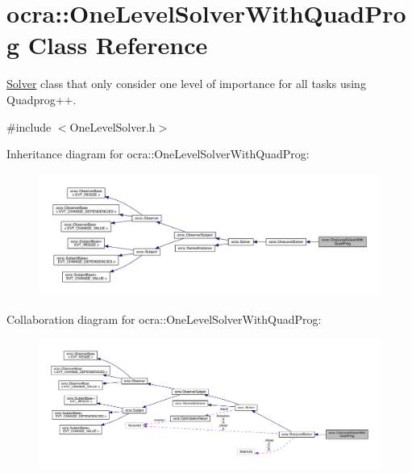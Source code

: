 \hypertarget{classocra_1_1OneLevelSolverWithQuadProg}{}\section{ocra\+:\+:One\+Level\+Solver\+With\+Quad\+Prog Class Reference}
\label{classocra_1_1OneLevelSolverWithQuadProg}


\hyperlink{classocra_1_1Solver}{Solver} class that only consider one level of importance for all tasks using Quadprog++.  




{\ttfamily \#include $<$One\+Level\+Solver.\+h$>$}



Inheritance diagram for ocra\+:\+:One\+Level\+Solver\+With\+Quad\+Prog\+:\nopagebreak
\begin{figure}[H]
\begin{center}
\leavevmode
\includegraphics[width=350pt]{db/d00/classocra_1_1OneLevelSolverWithQuadProg__inherit__graph}
\end{center}
\end{figure}


Collaboration diagram for ocra\+:\+:One\+Level\+Solver\+With\+Quad\+Prog\+:\nopagebreak
\begin{figure}[H]
\begin{center}
\leavevmode
\includegraphics[width=350pt]{da/dc6/classocra_1_1OneLevelSolverWithQuadProg__coll__graph}
\end{center}
\end{figure}
